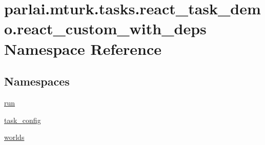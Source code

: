 \hypertarget{namespaceparlai_1_1mturk_1_1tasks_1_1react__task__demo_1_1react__custom__with__deps}{}\section{parlai.\+mturk.\+tasks.\+react\+\_\+task\+\_\+demo.\+react\+\_\+custom\+\_\+with\+\_\+deps Namespace Reference}
\label{namespaceparlai_1_1mturk_1_1tasks_1_1react__task__demo_1_1react__custom__with__deps}
\subsection*{Namespaces}
\begin{DoxyCompactItemize}
\item 
 \hyperlink{namespaceparlai_1_1mturk_1_1tasks_1_1react__task__demo_1_1react__custom__with__deps_1_1run}{run}
\item 
 \hyperlink{namespaceparlai_1_1mturk_1_1tasks_1_1react__task__demo_1_1react__custom__with__deps_1_1task__config}{task\+\_\+config}
\item 
 \hyperlink{namespaceparlai_1_1mturk_1_1tasks_1_1react__task__demo_1_1react__custom__with__deps_1_1worlds}{worlds}
\end{DoxyCompactItemize}

